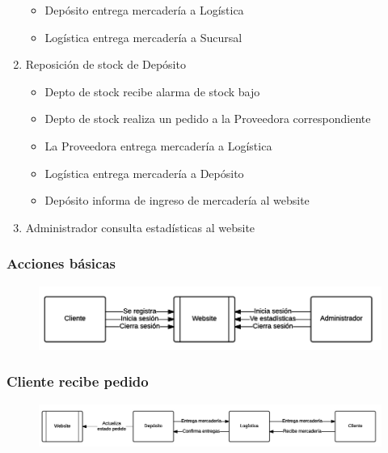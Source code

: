 \begin{enumerate}
\begin{itemize}
        \item Depósito entrega mercadería a Logística

        \item Logística entrega mercadería a Sucursal

      \end{itemize}

      \item Reposición de stock de Depósito

      \begin{itemize}

        \item Depto de stock recibe alarma de stock bajo 

        \item Depto de stock realiza un pedido a la Proveedora correspondiente

        \item La Proveedora entrega mercadería a Logística

        \item Logística entrega mercadería a Depósito

        \item Depósito informa de ingreso de mercadería al website

      \end{itemize}

      \item Administrador consulta estadísticas al website

    \end{enumerate}

    \subsubsection{Acciones básicas}
    \begin{figure}[H]
      \includegraphics[width=\linewidth]{images/acciones-basicas.png}
    \end{figure}

    \clearpage
    \subsubsection{Cliente recibe pedido}
    \begin{figure}[H]
      \includegraphics[width=\linewidth]{images/cliente-recibe-pedido.png}
    \end{figure}

